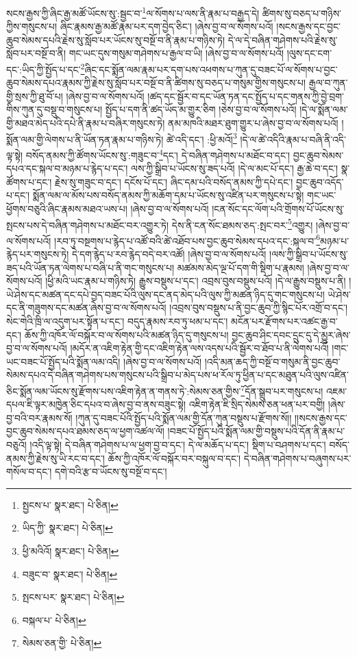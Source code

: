 སངས་རྒྱས་ཀྱི་ཞིང་རྒྱ་མཚོ་ཡོངས་སུ་:སྦྱང་བ་\footnote{སྤྱངས་པ་  སྣར་ཐང་།  པེ་ཅིན། }ལ་སོགས་པ་ལས་ནི་རྣམ་པ་བརྒྱད་དེ། ཚིགས་སུ་བཅད་པ་གཉིས་ཀྱིས་གསུངས་པ། ཞིང་རྣམས་རྒྱ་མཚོ་རྣམ་པར་དག་བྱེད་ཅིང་། །ཞེས་བྱ་བ་ལ་སོགས་པའོ། །སངས་རྒྱས་དང་བྱང་ཆུབ་སེམས་དཔའི་རྗེས་སུ་སློབ་པར་ཡོངས་སུ་བསྔོ་བ་ནི་རྣམ་པ་གཉིས་ཏེ། དེ་ལ་དེ་བཞིན་གཤེགས་པའི་རྗེས་སུ་སློབ་པར་བསྔོ་བ་ནི། གང་ཡང་དུས་གསུམ་གཤེགས་པ་རྒྱལ་བ་ཡི། །ཞེས་བྱ་བ་ལ་སོགས་པའོ། །ལུས་དང་ངག་དང་:ཡིད་ཀྱི་སྤྱོད་པ་དང་\footnote{ཡིད་ཀྱི་  སྣར་ཐང་།  པེ་ཅིན། }ཞིང་དང་སྨོན་ལམ་རྣམ་པར་དག་པས་འཕགས་པ་ཀུན་དུ་བཟང་པོ་ལ་སོགས་པ་བྱང་ཆུབ་སེམས་དཔའ་རྣམས་ཀྱི་རྗེས་སུ་སློབ་པར་བསྔོ་བ་ནི་ཚིགས་སུ་བཅད་པ་གསུམ་གྱིས་གསུངས་པ། རྒྱལ་བ་ཀུན་གྱི་སྲས་ཀྱི་ཐུ་བོ་པ། །ཞེས་བྱ་བ་ལ་སོགས་པའོ། །ཚད་དང་སྦྱོར་བ་དང་ཡོན་ཏན་དང་སྤྱོད་པ་དང་གནས་ཀྱི་བྱེ་བྲག་གིས་ཀུན་དུ་བསྡུ་བ་གསུངས་པ། སྤྱོད་པ་དག་ནི་ཚད་ཡོད་མ་གྱུར་ཅིག །ཅེས་བྱ་བ་ལ་སོགས་པའོ། །དེ་ལ་སྨོན་ལམ་གྱི་མཐའ་མེད་པའི་དཔེ་ནི་རྣམ་པ་བཞིར་གསུངས་ཏེ། ནམ་མཁའི་མཐར་ཐུག་གྱུར་པ་ཞེས་བྱ་བ་ལ་སོགས་པའོ། །སྨོན་ལམ་གྱི་ལེགས་པ་ནི་ཡོན་ཏན་རྣམ་པ་གཉིས་ཏེ། ཚེ་འདི་དང་། :ཕྱི་མའོ།\footnote{ཕྱི་མའིའོ།  སྣར་ཐང་།  པེ་ཅིན། } །དེ་ལ་ཚེ་འདིའི་རྣམ་པ་བཞི་ནི་འདི་ལྟ་སྟེ། བསོད་ནམས་ཀྱི་ཚོགས་ཡོངས་སུ་:གཟུང་བ་\footnote{བཟུང་བ་  སྣར་ཐང་།  པེ་ཅིན། }དང་། དེ་བཞིན་གཤེགས་པ་མཐོང་བ་དང་། བྱང་ཆུབ་སེམས་དཔའ་དང་སྐལ་བ་མཉམ་པ་རྙེད་པ་དང་། ལས་ཀྱི་སྒྲིབ་པ་ཡོངས་སུ་ཟད་པའོ། །དེ་ལ་མང་པོ་དང་། རྒྱ་ཆེ་བ་དང་། སྣ་ཚོགས་པ་དང་། རྗེས་སུ་གཟུང་བ་དང་། དངོས་པོ་དང་། ཞིང་དམ་པའི་བསོད་ནམས་ཀྱི་དཔེ་དང་། བྱང་ཆུབ་འདོད་པ་དང་། སྨོན་ལམ་ལ་མོས་པས་བསོད་ནམས་ཀྱི་མཆོག་དམ་པ་ཡོངས་སུ་འཛིན་པར་གསུངས་པ་སྟེ། གང་ཡང་ཕྱོགས་བཅུའི་ཞིང་རྣམས་མཐའ་ཡས་པ། །ཞེས་བྱ་བ་ལ་སོགས་པའོ། །ངན་སོང་དང་ལོག་པའི་གྲོགས་པོ་ཡོངས་སུ་སྤངས་པས་དེ་བཞིན་གཤེགས་པ་མཐོང་བར་འགྱུར་ཏེ། དེས་ནི་ངན་སོང་ཐམས་ཅད་:སྤང་བར་\footnote{སྤངས་པར་  སྣར་ཐང་།  པེ་ཅིན། }འགྱུར། །ཞེས་བྱ་བ་ལ་སོགས་པའོ། །རབ་ཏུ་བསྔགས་པ་རྙེད་པ་འཚོ་བའི་ཚེ་འཐོབ་པས་བྱང་ཆུབ་སེམས་དཔའ་དང་:སྐལ་བ་\footnote{བསྐལ་པ་  པེ་ཅིན། }མཉམ་པ་རྙེད་པར་གསུངས་ཏེ། དེ་དག་རྙེད་པ་རབ་རྙེད་བདེ་བར་འཚོ། །ཞེས་བྱ་བ་ལ་སོགས་པའོ། །ལས་ཀྱི་སྒྲིབ་པ་ཡོངས་སུ་ཟད་པའི་ཡོན་ཏན་ལེགས་པ་བཞི་པ་ནི་གང་གསུངས་པ། མཚམས་མེད་ལྔ་པོ་དག་གི་སྡིག་པ་རྣམས། །ཞེས་བྱ་བ་ལ་སོགས་པའོ། །ཕྱི་མའི་ཡང་རྣམ་པ་གཉིས་ཏེ། རྒྱུས་བསྡུས་པ་དང་། འབྲས་བུས་བསྡུས་པའོ། །དེ་ལ་རྒྱུས་བསྡུས་པ་ནི། །ཡེ་ཤེས་དང་མཚན་དང་དཔེ་བྱད་བཟང་པོའི་ལུས་དང་ནད་མེད་པའི་ལུས་ཀྱི་མཚན་ཉིད་དུ་གང་གསུངས་པ། ཡེ་ཤེས་དང་ནི་གཟུགས་དང་མཚན་ཞེས་བྱ་བ་ལ་སོགས་པའོ། །འབྲས་བུས་བསྡུས་པ་ནི་བྱང་ཆུབ་ཀྱི་སྙིང་པོར་འགྲོ་བ་དང་། སེང་གེའི་ཁྲི་ལ་འདུག་པར་སྟོན་པ་དང་། བདུད་རྣམས་རབ་ཏུ་ཕམ་པ་དང་། མངོན་པར་རྫོགས་པར་འཚང་རྒྱ་བ་དང་། ཆོས་ཀྱི་འཁོར་ལོ་བསྐོར་བ་ལ་སོགས་པའི་མཚན་ཉིད་དུ་གསུངས་པ། བྱང་ཆུབ་ཤིང་དབང་དྲུང་དུ་དེ་མྱུར་ཞེས་བྱ་བ་ལ་སོགས་པའོ། །མདོར་ན་འཇིག་རྟེན་གྱི་དང་འཇིག་རྟེན་ལས་འདས་པའི་སྦྱོར་བ་ཐོབ་པ་ནི་ལེགས་པའོ། །གང་ཡང་བཟང་པོ་སྤྱོད་པའི་སྨོན་ལམ་འདི། །ཞེས་བྱ་བ་ལ་སོགས་པའོ། །འདི་མན་ཆད་ཀྱི་བསྔོ་བ་གསུམ་ནི་བྱང་ཆུབ་སེམས་དཔའ་དེ་བཞིན་གཤེགས་པས་གསུངས་པའི་སྒྲིབ་པ་མེད་པས་ཕ་རོལ་ཏུ་ཕྱིན་པ་དང་མཐུན་པའི་ལུས་འཛིན་ཅིང་སྨོན་ལམ་ཡོངས་སུ་རྫོགས་པས་འཇིག་རྟེན་ན་གནས་ཏེ་:སེམས་ཅན་གྱིས་\footnote{སེམས་ཅན་གྱི་  པེ་ཅིན། }དོན་སྒྲུབ་པར་གསུངས་པ། འཇམ་དཔལ་ཇི་ལྟར་མཁྱེན་ཅིང་དཔའ་བ་ཞེས་བྱ་བ་ནས་བཟུང་སྟེ། འཇིག་རྟེན་ཇི་སྲིད་སེམས་ཅན་ཕན་པར་བགྱི། །ཞེས་བྱ་བའི་བར་རྣམས་སོ། །ཀུན་དུ་བཟང་པོའི་སྤྱོད་པའི་སྨོན་ལམ་གྱི་དོན་ཀུན་བསྡུས་པ་རྫོགས་སོ།། །།སངས་རྒྱས་དང་བྱང་ཆུབ་སེམས་དཔའ་ཐམས་ཅད་ལ་ཕྱག་འཚལ་ལོ། །བཟང་པོ་སྤྱོད་པའི་སྨོན་ལམ་གྱི་བསྡུས་པའི་དོན་ནི་རྣམ་པ་བཅུའོ། །འདི་ལྟ་སྟེ། དེ་བཞིན་གཤེགས་པ་ལ་ཕྱག་བྱ་བ་དང་། དེ་ལ་མཆོད་པ་དང་། སྡིག་པ་བཤགས་པ་དང་། བསོད་ནམས་ཀྱི་རྗེས་སུ་ཡི་རང་བ་དང་། ཆོས་ཀྱི་འཁོར་ལོ་བསྐོར་བར་བསྐུལ་བ་དང་། དེ་བཞིན་གཤེགས་པ་བཞུགས་པར་གསོལ་བ་དང་། དགེ་བའི་རྩ་བ་ཡོངས་སུ་བསྔོ་བ་དང་། 